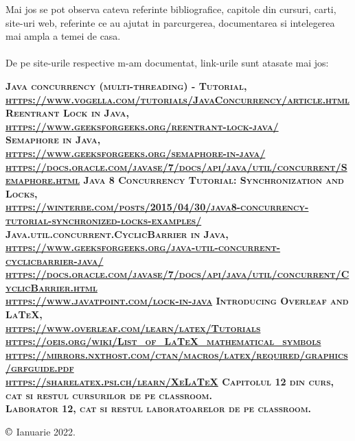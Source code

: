 \documentclass{article}
\begin{document}
\begin{flushleft}
Mai jos se pot observa cateva referinte bibliografice, capitole din cursuri, carti, site-uri web, referinte ce au ajutat in parcurgerea, documentarea si intelegerea mai ampla a temei de casa. \\\\
De pe site-urile respective m-am documentat, link-urile sunt atasate mai jos: 
\begin{thebibliography}{8}
\bfseries\scshape
        Java concurrency (multi-threading) - Tutorial,
        \textcolor{blue}{\\\url{https://www.vogella.com/tutorials/JavaConcurrency/article.html}}
         Reentrant Lock in Java,
        \textcolor{blue}{\\\url{https://www.geeksforgeeks.org/reentrant-lock-java/}}
        \\\url{}
         Semaphore in Java,
        \textcolor{blue}{\\\url{https://www.geeksforgeeks.org/semaphore-in-java/}}
        \\\url{https://docs.oracle.com/javase/7/docs/api/java/util/concurrent/Semaphore.html}
         Java 8 Concurrency Tutorial: Synchronization and Locks,
        \textcolor{blue}{\\\url{https://winterbe.com/posts/2015/04/30/java8-concurrency-tutorial-synchronized-locks-examples/}}
         Java.util.concurrent.CyclicBarrier in Java,
        \textcolor{blue}{\\\url{https://www.geeksforgeeks.org/java-util-concurrent-cyclicbarrier-java/}}
        \\\url{https://docs.oracle.com/javase/7/docs/api/java/util/concurrent/CyclicBarrier.html}
        \\\url{https://www.javatpoint.com/lock-in-java}
        Introducing Overleaf and LaTeX,
        \textcolor{blue}{\\\url{https://www.overleaf.com/learn/latex/Tutorials}
        \\\url{https://oeis.org/wiki/List_of_LaTeX_mathematical_symbols}
        \\\url{https://mirrors.nxthost.com/ctan/macros/latex/required/graphics/grfguide.pdf}
        \\\url{https://sharelatex.psi.ch/learn/XeLaTeX}}
         Capitolul 12 din curs, cat si restul cursurilor de pe classroom.\\
         Laborator 12, cat si restul laboratoarelor de pe classroom.
\end{thebibliography}
\large \textcolor{blue}{\bfseries{$\copyright$}} Ianuarie 2022.
\end{flushleft}
\end{document}
